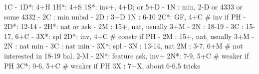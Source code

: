 1C - 
1D*: 4+H
1H*: 4+S
1S*: inv+, 4+D; or 5+D
   - 1N : min, 2-D or 4333 or some 4332
   - 2C : min unbal
   - 2D : 3+D
1N : 6-10
2C*: GF, 4+C  # inv if PH
   - 2D*: 12-14
		- 2H*: nat or ask
   - 2M : 15+, nat, usually 3+M
   - 2N : 18-19
   - 3C : 15-17, 6+C
   - 3X*: spl
2D*: inv, 4+C  # constr if PH
   - 2M : 15+, nat, usually 3+M
   - 2N : nat min
   - 3C : nat min
   - 3X*: spl
   - 3N : 13-14, nat
2M : 3-7, 6+M  # not interested in 18-19 bal, 2-M
   - 2N*: feature ask, inv+
2N*: 7-9, 5+C  # weaker if PH
3C*: 0-6, 5+C  # weaker if PH
3X : 7+X, about 6-6.5 tricks
